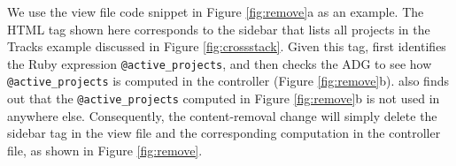 We use the view file code snippet in Figure \ref{fig:remove}a as an example.
The HTML tag shown here corresponds to the sidebar
that lists all projects 
in the Tracks example discussed in 
Figure \ref{fig:crossstack}.
Given this tag, \Tool first identifies the
Ruby expression {\tt @active\_projects}, and then checks the ADG to see how 
{\tt @active\_projects} is computed in the
controller (Figure \ref{fig:remove}b).
\Tool also finds out that the 
{\tt @active\_projects} computed in 
Figure \ref{fig:remove}b is not used in anywhere
else.
Consequently, the content-removal change will simply
delete the sidebar tag in the view file
and the corresponding computation
in the controller file, as shown in 
Figure \ref{fig:remove}.




